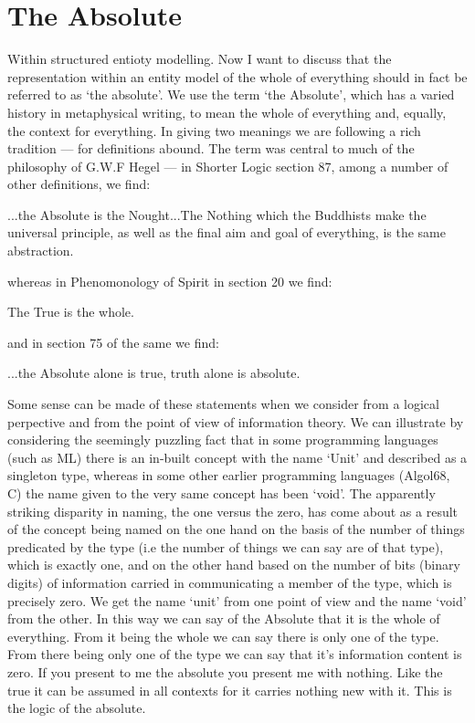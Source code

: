 \section{The Absolute}
\label{TheAbsolute}
Within structured entioty modelling.
Now  I want to discuss that the representation within an entity model of the whole of everything should in fact be referred to as `the absolute'.
\mynote
We use the term ‘the Absolute’, which has a varied history in metaphysical writing, to mean the whole of everything and, equally, the context for everything. In giving two meanings we are following a rich tradition — for definitions abound. The term was central to much of the philosophy of G.W.F Hegel — in Shorter Logic section 87, among a number of other definitions, we find:
\begin{erquote}
...the Absolute is the Nought...The Nothing which the Buddhists make the universal principle, as well as the final aim and goal of everything, is the same abstraction.
\end{erquote}
whereas in Phenomonology of Spirit in section 20 we find:
\begin{erquote}
The True is the whole.
\end{erquote}
and in section 75 of the same we find:
\begin{erquote}
...the Absolute alone is true, truth alone is absolute.
\end{erquote}
\mynote
Some sense can be made of these statements when we consider from a logical perpective and from the point of view of information theory. We can illustrate by considering the seemingly puzzling fact that in some programming languages (such as ML) there is an in-built concept with the name ‘Unit’ and described as a singleton type, whereas in some other earlier programming languages (Algol68, C) the name given to the very same concept has been ‘void’. The apparently striking disparity in naming, the one versus the zero, has come about as a result of the concept being named on the one hand on the basis of the number of things predicated by the type (i.e the number of things we can say are of that type), which is exactly one, and on the other hand based on the number of bits (binary digits) of information carried in communicating a member of the type, which is precisely zero. We get the name ‘unit’ from one point of view and the name ‘void’ from the other. In this way we can say of the Absolute that it is the whole of everything. From it being the whole we can say there is only one of the type. From there being only one of the type we can say that it's information content is zero. If you present to me the absolute you present me with nothing. Like the true it can be assumed in all contexts for it carries nothing new with it. This is the logic of the absolute.

